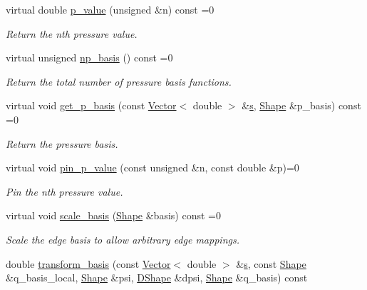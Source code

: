 \begin{DoxyCompactItemize}
virtual double \hyperlink{classoomph_1_1PoroelasticityEquations_abe547474535cb139acd45cc69e251516}{p\+\_\+value} (unsigned \&n) const =0
\begin{DoxyCompactList}\small\item\em Return the nth pressure value. \end{DoxyCompactList}\item 
virtual unsigned \hyperlink{classoomph_1_1PoroelasticityEquations_a44a16186f2923f811623e0cf088ff815}{np\+\_\+basis} () const =0
\begin{DoxyCompactList}\small\item\em Return the total number of pressure basis functions. \end{DoxyCompactList}\item 
virtual void \hyperlink{classoomph_1_1PoroelasticityEquations_af5dd9aa31ee8da161285e7ed6b7cb8fc}{get\+\_\+p\+\_\+basis} (const \hyperlink{classoomph_1_1Vector}{Vector}$<$ double $>$ \&\hyperlink{cfortran_8h_ab7123126e4885ef647dd9c6e3807a21c}{s}, \hyperlink{classoomph_1_1Shape}{Shape} \&p\+\_\+basis) const =0
\begin{DoxyCompactList}\small\item\em Return the pressure basis. \end{DoxyCompactList}\item 
virtual void \hyperlink{classoomph_1_1PoroelasticityEquations_a66ba2228e7e673865b11099e184496ce}{pin\+\_\+p\+\_\+value} (const unsigned \&n, const double \&p)=0
\begin{DoxyCompactList}\small\item\em Pin the nth pressure value. \end{DoxyCompactList}\item 
virtual void \hyperlink{classoomph_1_1PoroelasticityEquations_a92c3f4965f318a98eb7c6ac06de7aa4d}{scale\+\_\+basis} (\hyperlink{classoomph_1_1Shape}{Shape} \&basis) const =0
\begin{DoxyCompactList}\small\item\em Scale the edge basis to allow arbitrary edge mappings. \end{DoxyCompactList}\item 
double \hyperlink{classoomph_1_1PoroelasticityEquations_a43ab3d7f2f96d78346979b5eb4b2b986}{transform\+\_\+basis} (const \hyperlink{classoomph_1_1Vector}{Vector}$<$ double $>$ \&\hyperlink{cfortran_8h_ab7123126e4885ef647dd9c6e3807a21c}{s}, const \hyperlink{classoomph_1_1Shape}{Shape} \&q\+\_\+basis\+\_\+local, \hyperlink{classoomph_1_1Shape}{Shape} \&psi, \hyperlink{classoomph_1_1DShape}{D\+Shape} \&dpsi, \hyperlink{classoomph_1_1Shape}{Shape} \&q\+\_\+basis) const

\end{DoxyCompactItemize}
